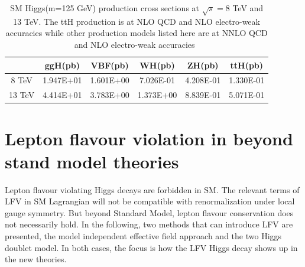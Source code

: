 \begin{table}[htp!]
\caption{SM Higgs(m=125 GeV) production cross sections at $\sqrt{s}=8$ TeV and 13 TeV. The ttH production is at NLO QCD and NLO electro-weak accuracies while other production models listed here are at NNLO QCD and NLO electro-weak accuracies~\cite{Yellow_report}}
\begin{center}
\begin{tabular}{|c|c|c|c|c|c|}\hline
           & ggH(pb)             &  VBF(pb)      &   WH(pb)      &   ZH(pb)          & ttH(pb)\\\hline
8 TeV  &  1.947E+01       & 1.601E+00    &  7.026E-01  &   4.208E-01    & 1.330E-01      \\\hline
13 TeV &   4.414E+01      &  3.783E+00   &  1.373E+00 &   8.839E-01    &  5.071E-01     \\\hline
\end{tabular}
\end{center}
\label{cross_section_numbers}
\end{table}









\section{Lepton flavour violation in beyond stand model theories}
Lepton flavour violating Higgs decays are forbidden in SM. The relevant terms of LFV in SM Lagrangian will not be compatible with renormalization under local gauge symmetry. But beyond Standard Model, lepton flavour conservation does not necessarily hold. In the following, two methods that can introduce LFV are presented, the model independent effective field approach and the two Higgs doublet model. In both cases, the focus is how the LFV Higgs decay shows up in the new theories. 


